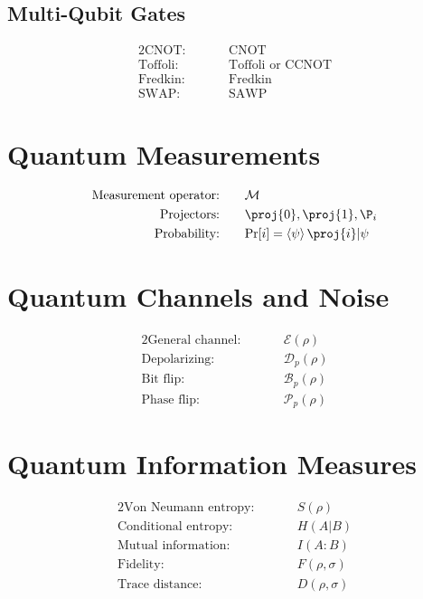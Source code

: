 \documentclass[12pt]{article}
\newcommand{\cnot}{\text{CNOT}}
\newcommand{\ccnot}{\text{CCNOT}}
\newcommand{\toffoli}{\text{Toffoli}}
\newcommand{\fredkin}{\text{Fredkin}}
\newcommand{\projzero}{\proj{0}}
\newcommand{\projone}{\proj{1}}
\newcommand{\channel}{\mathcal{E}}
\newcommand{\depolar}{\mathcal{D}}
\newcommand{\bitflip}{\mathcal{B}}
\newcommand{\phaseflip}{\mathcal{P}}
\newcommand{\condentropy}[2]{H(#1|#2)}
\newcommand{\mutualinfo}[2]{I(#1:#2)}
\newcommand{\vonneumann}[1]{S(#1)}
\newcommand{\fidelity}[2]{F(#1, #2)}
\newcommand{\tracedist}[2]{D(#1, #2)}
\newcommand{\prob}[1]{\text{Pr}[#1]}
\theoremstyle{definition}
\theoremstyle{remark}
\begin{document}
\subsection{Multi-Qubit Gates}
\begin{alignat}{2}
\text{CNOT:}     &\quad && \cnot \\
\text{Toffoli:}  &\quad && \toffoli \text{ or } \ccnot \\
\text{Fredkin:}  &\quad && \fredkin \\
\text{SWAP:}     &\quad && \text{SAWP}
\end{alignat}

\section{Quantum Measurements}

\begin{alignat}{2}
\text{Measurement operator:} &\quad && \mathcal{M} \\
\text{Projectors:}           &\quad && \projzero, \projone, \P_{i} \\
\text{Probability:}          &\quad && \prob{i} = \braket{\psi}{\proj{i}|\psi}
\end{alignat}



\section{Quantum Channels and Noise}

\begin{alignat}{2}
\text{General channel:} &\quad && \channel(\rho) \\
\text{Depolarizing:}    &\quad && \depolar_p(\rho) \\
\text{Bit flip:}        &\quad && \bitflip_p(\rho) \\
\text{Phase flip:}      &\quad && \phaseflip_p(\rho)
\end{alignat}


\section{Quantum Information Measures}

\begin{alignat}{2}
\text{Von Neumann entropy:} &\quad && \vonneumann{\rho} \\
\text{Conditional entropy:} &\quad && \condentropy{A}{B} \\
\text{Mutual information:}  &\quad && \mutualinfo{A}{B} \\
\text{Fidelity:}             &\quad && \fidelity{\rho}{\sigma} \\
\text{Trace distance:}       &\quad && \tracedist{\rho}{\sigma}
\end{alignat}
\end{document}
